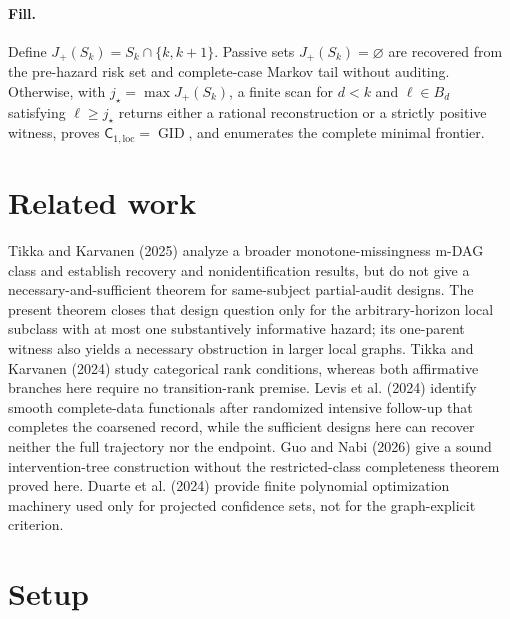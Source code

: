 \documentclass{article}
\begin{document}
\paragraph{Fill.} Define \(J_+(S_k)=S_k\cap\{k,k+1\}\). Passive sets \(J_+(S_k)=\varnothing\) are recovered from the pre-hazard risk set and complete-case Markov tail without auditing. Otherwise, with \(j_\star=\max J_+(S_k)\), a finite scan for \(d<k\) and \(\ell\in B_d\) satisfying \(\ell\ge j_\star\) returns either a rational reconstruction or a strictly positive witness, proves \(\mathsf C_{1,\mathrm{loc}}=\operatorname{GID}\), and enumerates the complete minimal frontier.

\section{Related work}

Tikka and Karvanen (2025) analyze a broader monotone-missingness m-DAG class and establish recovery and nonidentification results, but do not give a necessary-and-sufficient theorem for same-subject partial-audit designs. The present theorem closes that design question only for the arbitrary-horizon local subclass with at most one substantively informative hazard; its one-parent witness also yields a necessary obstruction in larger local graphs. Tikka and Karvanen (2024) study categorical rank conditions, whereas both affirmative branches here require no transition-rank premise. Levis et al. (2024) identify smooth complete-data functionals after randomized intensive follow-up that completes the coarsened record, while the sufficient designs here can recover neither the full trajectory nor the endpoint. Guo and Nabi (2026) give a sound intervention-tree construction without the restricted-class completeness theorem proved here. Duarte et al. (2024) provide finite polynomial optimization machinery used only for projected confidence sets, not for the graph-explicit criterion.

\section{Setup}
\end{document}
